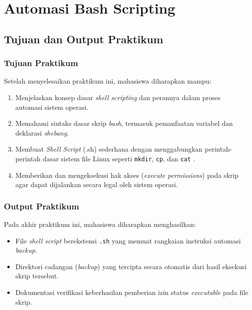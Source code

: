 
\chapter{Automasi Bash Scripting}
\label{chap:modul-04}

\section{Tujuan dan Output Praktikum}

\subsection{Tujuan Praktikum}
Setelah menyelesaikan praktikum ini, mahasiswa diharapkan mampu:
\begin{enumerate}
	\item Menjelaskan konsep dasar \textit{shell scripting} dan perannya dalam proses automasi sistem operasi.
	\item Memahami sintaks dasar skrip \textit{bash}, termasuk pemanfaatan variabel dan deklarasi \textit{shebang}.
	\item Membuat \textit{Shell Script} (.sh) sederhana dengan menggabungkan perintah-perintah dasar sistem file Linux seperti \texttt{mkdir}, \texttt{cp}, dan \texttt{cat} \cite{shotts2019linux}.
	\item Memberikan dan mengeksekusi hak akses (\textit{execute permissions}) pada skrip agar dapat dijalankan secara legal oleh sistem operasi.
\end{enumerate}

\subsection{Output Praktikum}
Pada akhir praktikum ini, mahasiswa diharapkan menghasilkan:
\begin{itemize}
	\item File \textit{shell script} berekstensi \texttt{.sh} yang memuat rangkaian instruksi automasi \textit{backup}.
	\item Direktori cadangan (\textit{backup}) yang tercipta secara otomatis dari hasil eksekusi skrip tersebut.
	\item Dokumentasi verifikasi keberhasilan pemberian izin status \textit{executable} pada file skrip.
\end{itemize}

